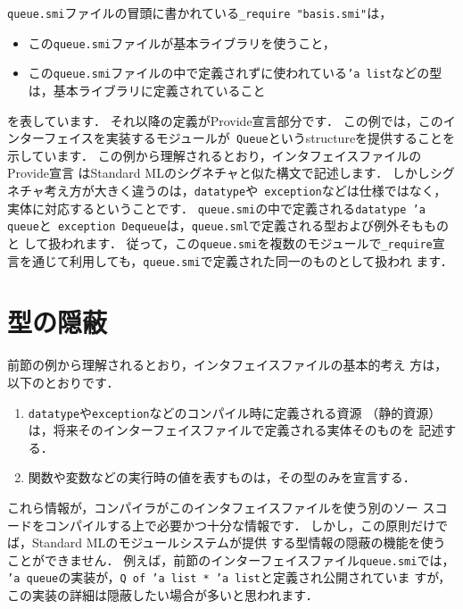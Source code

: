 \documentclass{jbook}
\begin{document}
	{\tt queue.smi}ファイルの冒頭に書かれている{\tt \_require
"basis.smi"}は，
\begin{itemize}
\item この{\tt queue.smi}ファイルが基本ライブラリを使うこと，
\item この{\tt queue.smi}ファイルの中で定義されずに使われている{\tt 'a
list}などの型は，基本ライブラリに定義されていること
\end{itemize}
を表しています．
	それ以降の定義がProvide宣言部分です．
	この例では，このインターフェイスを実装するモジュールが{\tt
Queue}というstructureを提供することを示しています．
	この例から理解されるとおり，インタフェイスファイルのProvide宣言
はStandard MLのシグネチャと似た構文で記述します．
	しかしシグネチャ考え方が大きく違うのは，{\tt datatype}や{\tt
exception}などは仕様ではなく，実体に対応するということです．
	{\tt queue.smi}の中で定義される{\tt datatype 'a queue}と{\tt
exception Dequeue}は，{\tt queue.sml}で定義される型および例外そもものと
して扱われます．
	従って，この{\tt queue.smi}を複数のモジュールで{\tt \_require}宣
言を通じて利用しても，{\tt queue.smi}で定義された同一のものとして扱われ
ます．

\section{型の隠蔽}
\label{sec:tutorialOpaqueTypeInterface}

	前節の例から理解されるとおり，インタフェイスファイルの基本的考え
方は，以下のとおりです．
\begin{enumerate}
\item {\tt datatype}や{\tt exception}などのコンパイル時に定義される資源
（静的資源）は，将来そのインターフェイスファイルで定義される実体そのものを
記述する．
\item 関数や変数などの実行時の値を表すものは，その型のみを宣言する．
\end{enumerate}
	これら情報が，コンパイラがこのインタフェイスファイルを使う別のソー
スコードをコンパイルする上で必要かつ十分な情報です．
	しかし，この原則だけでば，Standard MLのモジュールシステムが提供
する型情報の隠蔽の機能を使うことができません．
	例えば，前節のインターフェイスファイル{\tt queue.smi}では，{\tt
'a queue}の実装が，{\tt Q of 'a list * 'a list}と定義され公開されていま
すが，この実装の詳細は隠蔽したい場合が多いと思われます．
\end{document}
